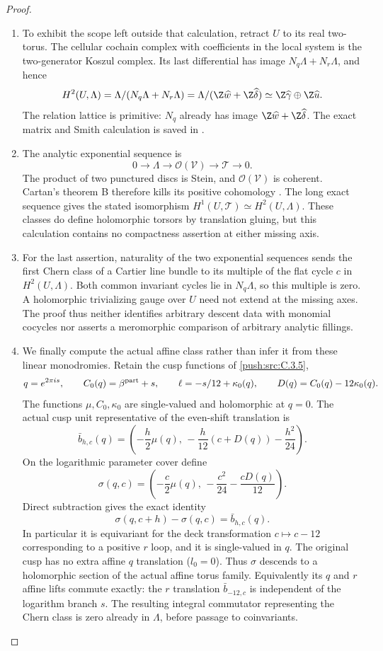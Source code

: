 \begin{proof}
\begin{enumerate}[label=\arabic*.,leftmargin=*]
\item To exhibit the scope left outside that calculation,
retract $U$ to its real two-torus.  The cellular
cochain complex with coefficients in the local
system is the two-generator Koszul complex.
Its last differential has image
$N_q\Lambda+N_r\Lambda$, and hence
\[
 H^2(U,\Lambda)
   =\Lambda/(N_q\Lambda+N_r\Lambda)
   =\Lambda/(\Z\widehat w+\Z\widehat\delta)
   \simeq\Z\widehat\gamma\oplus\Z\widehat u.
\]
The relation lattice is primitive: $N_q$ already
has image $\Z\widehat w+\Z\widehat\delta$.
The exact matrix and Smith calculation is saved
in .

\item The analytic exponential sequence is
\[
 0\longrightarrow\Lambda\longrightarrow
 \mathcal O(\mathcal V)\longrightarrow
 \mathscr T\longrightarrow0.
\]
The product of two punctured discs is Stein,
and $\mathcal O(\mathcal V)$ is coherent.
Cartan's theorem B therefore kills its positive
cohomology
\citep[Section 5]{Cartan1952B_AB}.
The long exact sequence gives the stated
isomorphism $H^1(U,\mathscr T)\simeq H^2(U,\Lambda)$.
These classes do define holomorphic torsors by
translation gluing, but this calculation contains
no compactness assertion at either missing axis.

\item For the last assertion, naturality of the two
exponential sequences sends the first Chern class
of a Cartier line bundle to its multiple of the
flat cycle $c$ in $H^2(U,\Lambda)$.  Both common
invariant cycles lie in $N_q\Lambda$, so this
multiple is zero.  A holomorphic trivializing
gauge over $U$ need not extend at the missing
axes.  The proof thus neither identifies
arbitrary descent data with monomial cocycles
nor asserts a meromorphic comparison of
arbitrary analytic fillings.

\item We finally compute the actual affine class rather
than infer it from these linear monodromies.  Retain
the cusp functions of \ref{push:src:C.3.5},
\[
 q=e^{2\pi i s},\qquad
 C_0(q)=\beta^{\rm part}+s,\qquad
 \ell=-s/12+\kappa_0(q),
 \qquad D(q)=C_0(q)-12\kappa_0(q).
\]
The functions $\mu,C_0,\kappa_0$ are single-valued
and holomorphic at $q=0$.  The actual cusp unit
representative of the even-shift translation is
\[
 \bar b_{h,c}(q)=
 \left(-\frac h2\mu(q),\,
       -\frac h{12}(c+D(q))-\frac{h^2}{24}\right).
\]
On the logarithmic parameter cover define
\[
 \sigma(q,c)=
 \left(-\frac c2\mu(q),\,
       -\frac{c^2}{24}-\frac{cD(q)}{12}\right).
\]
Direct subtraction gives the exact identity
\[
 \sigma(q,c+h)-\sigma(q,c)=\bar b_{h,c}(q).
\]
In particular it is equivariant for the deck
transformation $c\mapsto c-12$ corresponding to
a positive $r$ loop, and it is single-valued in
$q$.  The original cusp has no extra affine
$q$ translation ($l_0=0$).  Thus $\sigma$ descends
to a holomorphic section of the actual affine
torus family.  Equivalently its $q$ and $r$
affine lifts commute exactly: the $r$ translation
$\bar b_{-12,c}$ is independent of the logarithm
branch $s$.  The resulting integral commutator
representing the Chern class is zero already in
$\Lambda$, before passage to coinvariants.


\end{enumerate}
\end{proof}
